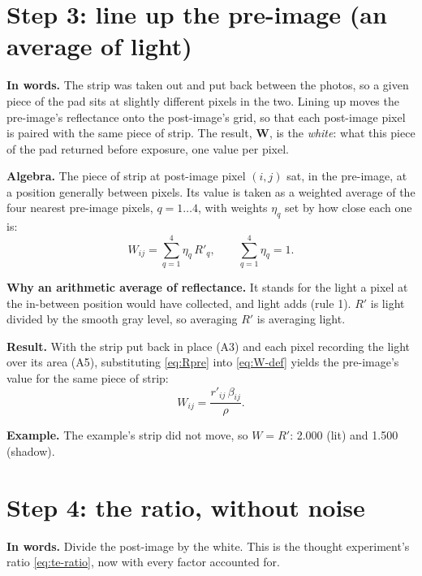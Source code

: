 \documentclass[11pt,letter]{article}
\newcommand{\iW}{\mathbf{W}}   %
\begin{document}
\section{Step 3: line up the pre-image (an average of light)}
\label{sec:lineup}

\textbf{In words.}  The strip was taken out and put back between the
photos, so a given piece of the pad sits at slightly different pixels in
the two.  Lining up moves the pre-image's reflectance onto the
post-image's grid, so that each post-image pixel is paired with the same
piece of strip.  The result, $\iW$, is the \emph{white}: what this piece
of the pad returned before exposure, one value per pixel.

\textbf{Algebra.}  The piece of strip at post-image pixel $(i, j)$ sat,
in the pre-image, at a position generally between pixels.  Its value is
taken as a weighted average of the four nearest pre-image pixels,
$q = 1 \dots 4$, with weights $\eta_q$ set by how close each one is:
\begin{equation}
  W_{ij} = \sum_{q=1}^{4} \eta_q\, R'_q , \qquad
  \sum_{q=1}^{4} \eta_q = 1 .
  \label{eq:W-def}
\end{equation}

\textbf{Why an arithmetic average of reflectance.}  It stands for the
light a pixel at the in-between position would have collected, and light
adds (rule 1).  $R'$ is light divided by the smooth gray level, so
averaging $R'$ is averaging light.

\textbf{Result.}  With the strip put back in place (A3) and each pixel
recording the light over its area (A5), substituting \eqref{eq:Rpre} into
\eqref{eq:W-def} yields the pre-image's value for the same piece of
strip:
\begin{equation}
  W_{ij} = \frac{r'_{ij}\, \beta_{ij}}{\rho} .
  \label{eq:W}
\end{equation}

\textbf{Example.}  The example's strip did not move, so $W = R'$: 2.000
(lit) and 1.500 (shadow).

\section{Step 4: the ratio, without noise}
\label{sec:ratio}

\textbf{In words.}  Divide the post-image by the white.  This is the
thought experiment's ratio \eqref{eq:te-ratio}, now with every factor
accounted for.
\end{document}
